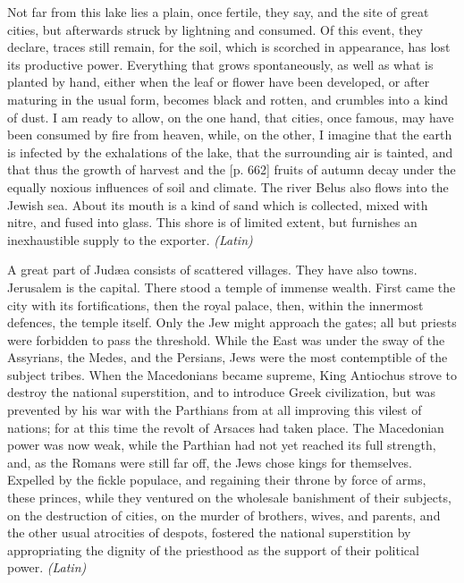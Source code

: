Not far from this lake lies a plain, once fertile, they say, and the site of great cities, but afterwards struck by lightning and consumed. Of this event, they declare, traces still remain, for the soil, which is scorched in appearance, has lost its productive power. Everything that grows spontaneously, as well as what is planted by hand, either when the leaf or flower have been developed, or after maturing in the usual form, becomes black and rotten, and crumbles into a kind of dust. I am ready to allow, on the one hand, that cities, once famous, may have been consumed by fire from heaven, while, on the other, I imagine that the earth is infected by the exhalations of the lake, that the surrounding air is tainted, and that thus the growth of harvest and the [p. 662] fruits of autumn decay under the equally noxious influences of soil and climate. The river Belus also flows into the Jewish sea. About its mouth is a kind of sand which is collected, mixed with nitre, and fused into glass. This shore is of limited extent, but furnishes an inexhaustible supply to the exporter. \emph{(Latin)}


A great part of Judæa consists of scattered villages. They have also towns. Jerusalem is the capital. There stood a temple of immense wealth. First came the city with its fortifications, then the royal palace, then, within the innermost defences, the temple itself. Only the Jew might approach the gates; all but priests were forbidden to pass the threshold. While the East was under the sway of the Assyrians, the Medes, and the Persians, Jews were the most contemptible of the subject tribes. When the Macedonians became supreme, King Antiochus strove to destroy the national superstition, and to introduce Greek civilization, but was prevented by his war with the Parthians from at all improving this vilest of nations; for at this time the revolt of Arsaces had taken place. The Macedonian power was now weak, while the Parthian had not yet reached its full strength, and, as the Romans were still far off, the Jews chose kings for themselves. Expelled by the fickle populace, and regaining their throne by force of arms, these princes, while they ventured on the wholesale banishment of their subjects, on the destruction of cities, on the murder of brothers, wives, and parents, and the other usual atrocities of despots, fostered the national superstition by appropriating the dignity of the priesthood as the support of their political power. \emph{(Latin)}

